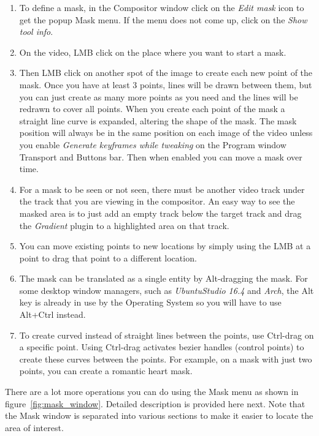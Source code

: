 \begin{enumerate}
    \item To define a mask, in the Compositor window click on the \textit{Edit mask} icon to get the popup Mask menu.  If the menu does not come up, click on the \textit{Show tool info}.
    \item  On the video, LMB click on the place where you want to start a mask.
    \item  Then LMB click on another spot of the image to create each new point of the mask. Once
you have at least 3 points, lines will be drawn between them, but you can just create as many
more points as you need and the lines will be redrawn to cover all points. When you 
create each point of the mask a straight line curve is expanded, altering the shape of the mask.
The mask position will always be in the same position on each image of the video unless you enable 
\textit{Generate keyframes while tweaking} on the Program window Transport and Buttons bar. Then when 
enabled you can move a mask over time.
     \item For a mask to be seen or not seen, there must be another video track under the track
that you are viewing in the compositor.  An easy way to see the masked area is to just add an empty track
below the target track and drag the \textit{Gradient} plugin to a highlighted area on that track.
     \item  You can move existing points to new locations by simply using the LMB at a point to
drag that point to a different location.
    \item  The mask can be translated as a single entity by Alt-dragging the mask.  For some desktop
window managers, such as \textit{UbuntuStudio 16.4} and \textit{Arch}, the Alt key is already in use
by the Operating System so you will have to use Alt+Ctrl instead.
    \item To create curved instead of straight lines between the points, use  Ctrl-drag on a
specific point. Using Ctrl-drag activates bezier handles (control points) to create these curves
between the points. For example, on a mask with just two points, you can create a romantic heart mask.     
\end{enumerate}

There are a lot more operations you can do using the Mask menu as shown in 
figure~\ref{fig:mask_window}.  Detailed description is provided here next.  Note that the Mask
window is separated into various sections to make it easier to locate the area of interest.

